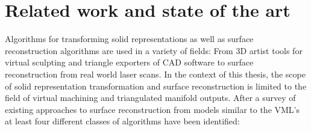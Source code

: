 
\chapter{Related work and state of the art}
\label{ch:state_of_the_art}

Algorithms for transforming solid representations as well as surface reconstruction algorithms are used in a variety of fields:
From 3D artist tools for virtual sculpting and triangle exporters of CAD software to surface reconstruction from real world laser scans.
In the context of this thesis, the scope of solid representation transformation and surface reconstruction is limited to the field of virtual machining and triangulated manifold outputs.
After a survey of existing approaches to surface reconstruction from models similar to the VML's at least four different classes of algorithms have been identified:

